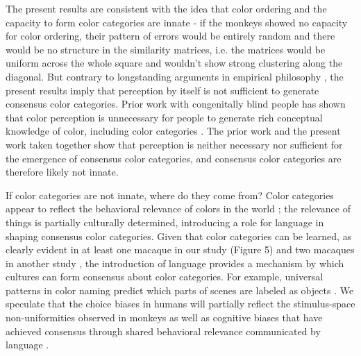 \documentclass[9pt,biorxiv,lineno,onehalfspacing]{lapreprint}
\begin{document}
\begin{refsection}
The present results are consistent with the idea that color ordering and the capacity to form color categories are innate - if the monkeys showed no capacity for color ordering, their pattern of errors would be entirely random and there would be no structure in the similarity matrices, i.e. the matrices would be uniform across the whole square and wouldn't show strong clustering along the diagonal. 
But contrary to longstanding arguments in empirical philosophy \citep{RN18743}, the present results imply that perception by itself is not sufficient to generate consensus color categories. 
Prior work with congenitally blind people has shown that color perception is unnecessary for people to generate rich conceptual knowledge of color, including color categories \citep{kim_shared_2021}. 
The prior work and the present work taken together show that perception is neither necessary nor sufficient for the emergence of consensus color categories, and consensus color categories are therefore likely not innate. 

If color categories are not innate, where do they come from? 
Color categories appear to reflect the behavioral relevance of colors in the world \citep{RN18616,gibson_color_2017}; the relevance of things is partially culturally determined, introducing a role for language in shaping consensus color categories. Given that color categories can be learned, as clearly evident in at least one macaque in our study (Figure 5) and two macaques in another study \citep{panichello_error-correcting_2019}, the introduction of language provides a mechanism by which cultures can form consensus about color categories. 
For example, universal patterns in color naming predict which parts of scenes are labeled as objects \citep{gibson_color_2017}. 
We speculate that the choice biases in humans will partially reflect the stimulus-space non-uniformities observed in monkeys as well as cognitive biases that have achieved consensus through shared behavioral relevance communicated by language \citep{RN18511,RN18514,RN18602}. 


\printbibliography[title=Main Text References]
\end{refsection}

\if@endfloat\clearpage\processdelayedfloats\clearpage\fi 
\end{document}
